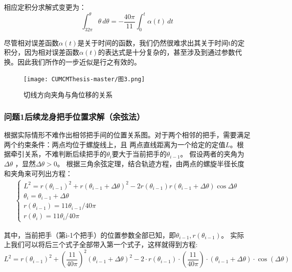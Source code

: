 \documentclass{cumcmthesis1}
\begin{document}
\par
相应定积分求解式变更为：
\begin{equation}
\int_{32 \pi}^{\theta}  \theta \,d\theta =-\frac{40 \pi}{11}\int_{0}^{t} \alpha(t) \,dt 
\end{equation}
\par
尽管相对误差函数$\alpha(t)$是关于时间的函数，我们仍然很难求出其关于时间t的定积分，因为相对误差函数$\alpha(t)$的表达式是十分复杂的，甚至涉及到通过参数代换。因此我们所作的一步近似是行之有效的。
\begin{figure}
    \caption{切线方向夹角与角位移的关系}
    \centering    
    \texttt{[image: CUMCMThesis-master/图3.png]}
\end{figure}
\par


\subsubsection{\textbf{问题1}后续龙身把手位置求解（余弦法）}
\par
根据实际情形不难作出相邻把手间的位置关系图。对于两个相邻的把手，需要满足两个约束条件：两点均位于螺旋线上，且
两点直线距离为一个给定的定值$L$。根据牵引关系，不难判断后续把手的$\theta_{i}$要大于当前把手的$\theta_{i-1}$。
假设两者的夹角为$\Delta  \theta$ ，显然$\Delta  \theta >0$。
根据三角余弦定理，结合轨迹方程，由两点的螺旋半径长度和夹角来可列出方程：
\begin{align}
    \begin{cases}
        L^2=r(\theta_{i-1})^2+r(\theta_{i-1}+\Delta  \theta)^2-2r(\theta_{i-1})r(\theta_{i-1}+\Delta  \theta) \cos \Delta \theta\\
        \theta_{i}=\theta_{i-1}+\Delta  \theta\\
        r(\theta_{i-1})=11 \theta_{i-1} /40 \pi \\
        r(\theta_{i})=11 \theta_{i} /40 \pi
    \end{cases}
\end{align}
\par
其中，当前把手（第i-1个把手）的位置参数全部已知，即$\theta_{i-1},r(\theta_{i-1})$。
实际上我们可以将后三个式子全部带入第一个式子，这样就得到方程:
\begin{equation}
    L^2 = r(\theta_{i-1})^2 + \left(\frac{11}{40 \pi}\right)^2 \left(\theta_{i-1} + \Delta \theta\right)^2 
    - 2 \cdot r(\theta_{i-1}) \cdot \left(\frac{11}{40 \pi}\right) \cdot \left(\theta_{i-1} + \Delta \theta\right) \cdot \cos(\Delta \theta)
\end{equation}
\par
\end{document}
